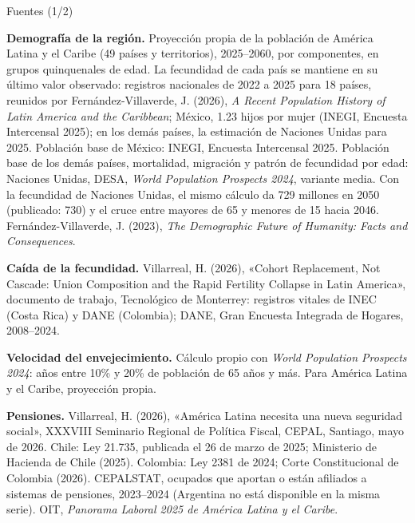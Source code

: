 \documentclass[aspectratio=169,10pt]{beamer}
\begin{document}
\begin{frame}{Fuentes (1/2)}
  \vspace{0.1em}
  {\fontsize{6.1}{7.5}\selectfont\raggedright
  \textbf{Demografía de la región.} Proyección propia de la población de América Latina y el Caribe (49 países y territorios), 2025--2060, por componentes, en grupos quinquenales de edad. La fecundidad de cada país se mantiene en su último valor observado: registros nacionales de 2022 a 2025 para 18 países, reunidos por Fernández-Villaverde, J. (2026), \emph{A Recent Population History of Latin America and the Caribbean}; México, 1.23 hijos por mujer (INEGI, Encuesta Intercensal 2025); en los demás países, la estimación de Naciones Unidas para 2025. Población base de México: INEGI, Encuesta Intercensal 2025. Población base de los demás países, mortalidad, migración y patrón de fecundidad por edad: Naciones Unidas, DESA, \emph{World Population Prospects 2024}, variante media. Con la fecundidad de Naciones Unidas, el mismo cálculo da 729 millones en 2050 (publicado: 730) y el cruce entre mayores de 65 y menores de 15 hacia 2046. Fernández-Villaverde, J. (2023), \emph{The Demographic Future of Humanity: Facts and Consequences}.\par\vspace{0.5em}
  \textbf{Caída de la fecundidad.} Villarreal, H. (2026), «Cohort Replacement, Not Cascade: Union Composition and the Rapid Fertility Collapse in Latin America», documento de trabajo, Tecnológico de Monterrey: registros vitales de INEC (Costa Rica) y DANE (Colombia); DANE, Gran Encuesta Integrada de Hogares, 2008--2024.\par\vspace{0.5em}
  \textbf{Velocidad del envejecimiento.} Cálculo propio con \emph{World Population Prospects 2024}: años entre 10\% y 20\% de población de 65 años y más. Para América Latina y el Caribe, proyección propia.\par\vspace{0.5em}
  \textbf{Pensiones.} Villarreal, H. (2026), «América Latina necesita una nueva seguridad social», XXXVIII Seminario Regional de Política Fiscal, CEPAL, Santiago, mayo de 2026. Chile: Ley 21.735, publicada el 26 de marzo de 2025; Ministerio de Hacienda de Chile (2025). Colombia: Ley 2381 de 2024; Corte Constitucional de Colombia (2026). CEPALSTAT, ocupados que aportan o están afiliados a sistemas de pensiones, 2023--2024 (Argentina no está disponible en la misma serie). OIT, \emph{Panorama Laboral 2025 de América Latina y el Caribe}.\par\vspace{0.5em}
}
\end{frame}
\end{document}
